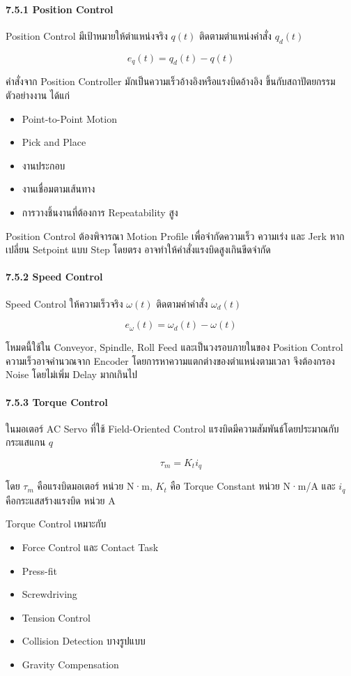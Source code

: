 \paragraph{7.5.1 Position Control}

Position Control มีเป้าหมายให้ตำแหน่งจริง $q(t)$ ติดตามตำแหน่งคำสั่ง $q_d(t)$

\[
e_q(t)=q_d(t)-q(t)
\]

คำสั่งจาก Position Controller มักเป็นความเร็วอ้างอิงหรือแรงบิดอ้างอิง ขึ้นกับสถาปัตยกรรม ตัวอย่างงาน ได้แก่

\begin{itemize}
    \item Point-to-Point Motion
    \item Pick and Place
    \item งานประกอบ
    \item งานเชื่อมตามเส้นทาง
    \item การวางชิ้นงานที่ต้องการ Repeatability สูง
\end{itemize}

Position Control ต้องพิจารณา Motion Profile เพื่อจำกัดความเร็ว ความเร่ง และ Jerk หากเปลี่ยน Setpoint แบบ Step โดยตรง อาจทำให้คำสั่งแรงบิดสูงเกินขีดจำกัด

\paragraph{7.5.2 Speed Control}

Speed Control ให้ความเร็วจริง $\omega(t)$ ติดตามค่าคำสั่ง $\omega_d(t)$

\[
e_\omega(t)=\omega_d(t)-\omega(t)
\]

โหมดนี้ใช้ใน Conveyor, Spindle, Roll Feed และเป็นวงรอบภายในของ Position Control ความเร็วอาจคำนวณจาก Encoder โดยการหาความแตกต่างของตำแหน่งตามเวลา จึงต้องกรอง Noise โดยไม่เพิ่ม Delay มากเกินไป

\paragraph{7.5.3 Torque Control}

ในมอเตอร์ AC Servo ที่ใช้ Field-Oriented Control แรงบิดมีความสัมพันธ์โดยประมาณกับกระแสแกน $q$

\[
\tau_m=K_t i_q
\]

โดย $\tau_m$ คือแรงบิดมอเตอร์ หน่วย N·m, $K_t$ คือ Torque Constant หน่วย N·m/A และ $i_q$ คือกระแสสร้างแรงบิด หน่วย A

Torque Control เหมาะกับ

\begin{itemize}
    \item Force Control และ Contact Task
    \item Press-fit
    \item Screwdriving
    \item Tension Control
    \item Collision Detection บางรูปแบบ
    \item Gravity Compensation
\end{itemize}

